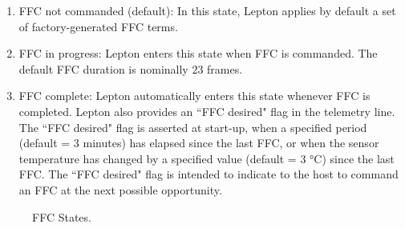 \begin{enumerate}
    \item FFC not commanded (default): In this state, Lepton applies by default a
set of factory-generated FFC terms.
    \item FFC in progress: Lepton enters this
state when FFC is commanded. The default FFC duration is nominally $23$ frames.
    \item FFC complete: Lepton automatically enters this state whenever FFC is
completed. Lepton also provides an ``FFC desired" flag in the telemetry line.
The ``FFC desired" flag is asserted at start-up, when a specified period
(default = 3 minutes) has elapsed since the last FFC, or when the sensor
temperature has changed by a specified value (default = 3 \si{\celsius}) since
the last FFC. The ``FFC desired" flag is intended to indicate to the host to
command an FFC at the next possible opportunity.
\end{enumerate}
%
\begin{figure}[htb]
    \centering
    \resizebox{0.35\textwidth}{!}{}
    \caption{FFC States.}
    \label{fig:FFC States}
\end{figure}
%
